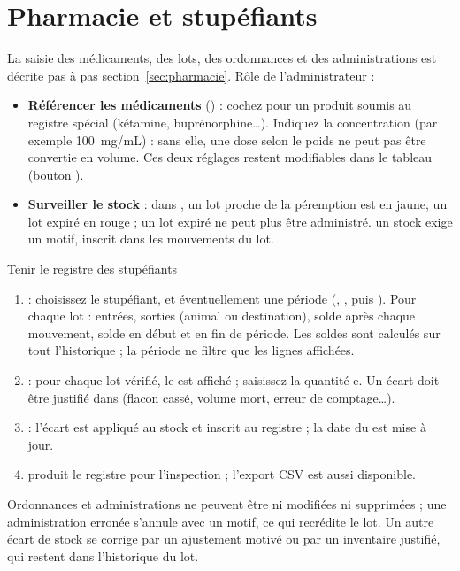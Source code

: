 \documentclass[11pt,a4paper]{article}
\begin{document}
\section{Pharmacie et stupéfiants}
La saisie des médicaments, des lots, des ordonnances et des administrations
est décrite pas à pas section~\ref{sec:pharmacie}. Rôle de l'administrateur :
\begin{itemize}
  \item \textbf{Référencer les médicaments} () :
    cochez  pour un produit
    soumis au registre spécial (kétamine, buprénorphine…). Indiquez la
    concentration (par exemple 100~mg/mL) : sans elle, une dose selon le
    poids ne peut pas être convertie en volume. Ces deux réglages restent
    modifiables dans le tableau  (bouton ).
  \item \textbf{Surveiller le stock} : dans , un lot
    proche de la péremption est en jaune, un lot expiré en rouge ; un lot
    expiré ne peut plus être administré.  un stock exige un
    motif, inscrit dans les mouvements du lot.
\end{itemize}

\begin{procedure}{Tenir le registre des stupéfiants}
\begin{enumerate}
  \item {} : choisissez le stupéfiant, et
    éventuellement une période (, , puis ).
    Pour chaque lot : entrées, sorties (animal ou destination), solde après
    chaque mouvement, solde en début et en fin de période. Les soldes sont
    calculés sur tout l'historique ; la période ne filtre que les lignes
    affichées.
  \item {} : pour chaque lot vérifié, le
     est affiché ; saisissez la quantité
    e. Un écart doit être justifié dans  (flacon cassé, volume mort, erreur de comptage…).
  \item {} : l'écart est appliqué au stock et
    inscrit au registre ; la date du  est mise à
    jour.
  \item {} produit le registre pour l'inspection ;
    l'export CSV est aussi disponible.
\end{enumerate}
\end{procedure}
\begin{trace}
Ordonnances et administrations ne peuvent être ni modifiées ni supprimées ;
une administration erronée s'annule avec un motif, ce qui recrédite le lot.
Un autre écart de stock se corrige par un ajustement motivé ou par un
inventaire justifié, qui restent dans l'historique du lot.
\end{trace}
\end{document}
